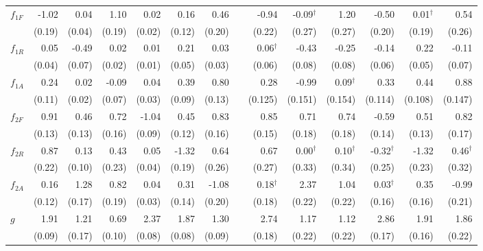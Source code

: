\begin{table} [H]
\begin{tabular}{lrrrrrrrrrrrrr}
$f_{1F}$ & -1.02  & 0.04   & 1.10   & 0.02   & 0.16   & 0.46   && -0.94   & \cellcolor{gray!25}-0.09$^{\dagger}$   & 1.20    & \cellcolor{gray!25}-0.50   & 0.01$^{\dagger}$    & 0.54 \\ 
         & (0.19) & (0.04) & (0.19) & (0.02) & (0.12) & (0.20) && (0.22)  & (0.27)  & (0.27)  & (0.20)  & (0.19)  & (0.26) \\ [0.08cm]
$f_{1R}$ & 0.05   & -0.49  & 0.02   & 0.01   & 0.21   & 0.03   && 0.06$^{\dagger}$    & -0.43   & \cellcolor{gray!25}-0.25   & \cellcolor{gray!25}-0.14   & 0.22    & \cellcolor{gray!25}-0.11 \\ 
         & (0.04) & (0.07) & (0.02) & (0.01) & (0.05) & (0.03) && (0.06)  & (0.08)  & (0.08)  & (0.06)  & (0.05)  & (0.07) \\ [0.08cm]
$f_{1A}$ & 0.24   & 0.02   & -0.09  & 0.04   & 0.39   & 0.80   && 0.28    & \cellcolor{gray!25}-0.99   & \cellcolor{gray!25}0.09$^{\dagger}$    & \cellcolor{gray!25}0.33    & 0.44    & 0.88 \\ 
         & (0.11) & (0.02) & (0.07) & (0.03) & (0.09) & (0.13) && (0.125) & (0.151) & (0.154) & (0.114) & (0.108) & (0.147) \\ [0.08cm]
$f_{2F}$ & 0.91   & 0.46   & 0.72   & -1.04  & 0.45   & 0.83   && 0.85    & 0.71    & 0.74    & \cellcolor{gray!25}-0.59   & 0.51    & 0.82 \\ 
         & (0.13) & (0.13) & (0.16) & (0.09) & (0.12) & (0.16) && (0.15)  & (0.18)  & (0.18)  & (0.14)  & (0.13)  & (0.17) \\ [0.08cm]
$f_{2R}$ & 0.87   & 0.13  & 0.43   & 0.05   & -1.32  & 0.64   && 0.67    & 0.00$^{\dagger}$    & 0.10$^{\dagger}$    & \cellcolor{gray!25}-0.32$^{\dagger}$   & -1.32   & 0.46$^{\dagger}$ \\ 
         & (0.22) & (0.10) & (0.23) & (0.04) & (0.19) & (0.26) && (0.27)  & (0.33)  & (0.34)  & (0.25)  & (0.23)  & (0.32) \\ [0.07cm]
$f_{2A}$ & 0.16   & 1.28   & 0.82   & 0.04   & 0.31   & -1.08  && 0.18$^{\dagger}$    & 2.37    & 1.04    & 0.03$^{\dagger}$    & 0.35    & -0.99 \\ 
         & (0.12) & (0.17) & (0.19) & (0.03) & (0.14) & (0.20) && (0.18)  & (0.22)  & (0.22)  & (0.16)  & (0.16)  & (0.21) \\ [0.07cm]
$g$      & 1.91   & 1.21   & 0.69   & 2.37   & 1.87   & 1.30   && 2.74    & 1.17    & 1.12    & 2.86    & 1.91    & 1.86 \\ 
         & (0.09) & (0.17) & (0.10) & (0.08) & (0.08) & (0.09) && (0.18)  & (0.22)  & (0.22)  & (0.17)  & (0.16)  & (0.22) \\ [0.07cm]

\end{tabular}
\end{table}
